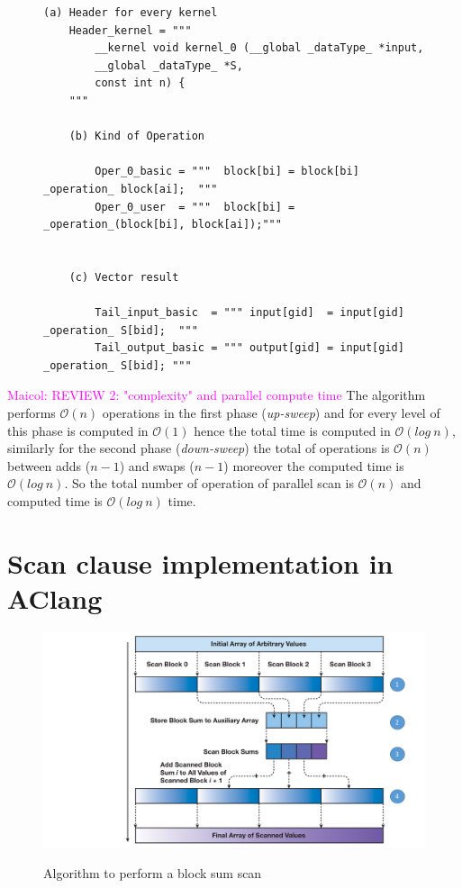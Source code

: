 \documentclass[Ingles]{ic-tese-v1}
\newcommand{\maicol}[1]{\noindent\textcolor{magenta}{Maicol: {#1}}}
\newcommand{\maicol}[1]{}
\begin{document}
\begin{figure}[t]
	\lstset{basicstyle=\scriptsize}
	\begin{lstlisting}[label=lst:TemplateScan, caption={Template to generate the final kernel of scan parallel algorithm}, escapeinside={}]
	(a) Header for every kernel
	Header_kernel = """
		__kernel void kernel_0 (__global _dataType_ *input,
		__global _dataType_ *S,
		const int n) {
	"""

	(b) Kind of Operation

		Oper_0_basic = """	block[bi] = block[bi] _operation_ block[ai];  """
		Oper_0_user  = """	block[bi] = _operation_(block[bi], block[ai]);"""


	(c) Vector result

		Tail_input_basic  = """	input[gid]  = input[gid] _operation_ S[bid];  """
		Tail_output_basic = """ output[gid] = input[gid] _operation_ S[bid]; """

	\end{lstlisting}
\end{figure}



\maicol{REVIEW 2: "complexity" and parallel compute time}
The algorithm  performs $\mathcal{O}(n)$ operations in the first
phase (\textit{up-sweep}) and for every level of this phase is computed in $\mathcal{O}(1)$ hence
the total time is computed in $\mathcal{O}(log\ n)$, similarly for the second phase
(\textit{down-sweep}) the total of operations is $\mathcal{O}(n)$ between adds ($n-1$)
and swaps ($n-1$) moreover the computed time is $\mathcal{O}(log\ n)$.
So the total number of operation of parallel scan
is $\mathcal{O}(n)$ and computed time is
$\mathcal{O}(log\ n)$ time.


\section{Scan clause implementation in AClang}
\label{sec:ScanInAClang}

\begin{figure}[t]
	\centering
	\caption{Algorithm to perform a block sum scan}
	\includegraphics[scale=0.35]{images/phaseScan.pdf}
	\label{fig:scheme}
\end{figure}
\end{document}
